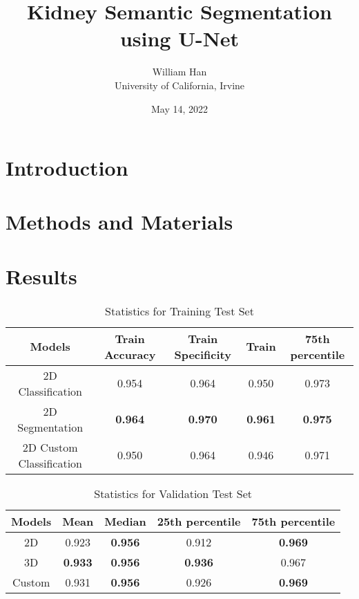 \documentclass [12pt, letterpaper] {article}
\title{Kidney Semantic Segmentation using U-Net}
\author{William Han \\ University of California, Irvine}
\date{May 14, 2022}
\begin{document}
\maketitle

\section{Introduction}


\section{Methods and Materials }



\section{Results}

\begin{table}[h!]
\centering

\begin{tabular}{||c c c c c ||} 
 \hline
 Models & Train Accuracy & Train Specificity & Train & 75th percentile \\ [0.5ex] 
 \hline
 2D Classification & 0.954 & 0.964 & 0.950 & 0.973 \\ 
 2D Segmentation  & \textbf{0.964} & \textbf{0.970} & \textbf{0.961} & \textbf{0.975}\\
 2D Custom Classification & 0.950 & 0.964 & 0.946 & 0.971\\

 \hline
\end{tabular}

\caption{Statistics for Training Test Set}
\label{table:data}
\end{table}

\begin{table}[h!]
\centering

\begin{tabular}{||c c c c c ||} 
 \hline
 Models & Mean & Median & 25th percentile & 75th percentile \\ [0.5ex] 
 \hline
 2D  & 0.923 & \textbf{0.956} & 0.912 & \textbf{0.969}\\ 
 3D  & \textbf{0.933} & \textbf{0.956} & \textbf{0.936} &0.967 \\
 Custom & 0.931 & \textbf{0.956} &  0.926 & \textbf{0.969}\\

 \hline
\end{tabular}

\caption{Statistics for Validation Test Set}
\label{table:data}
\end{table}
\end{document}
